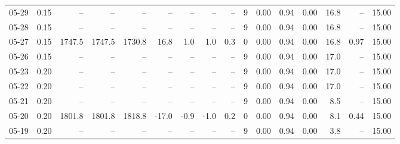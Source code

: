 \begin{threeparttable}
{\begin{tabular}{lrrrrrrrrrrrrrrr}
  05-29 &     0.15 &     -- &     -- &     -- &         -- &             -- &                       -- &                  -- &              9 &       0.00 &      0.94 &           0.00 &             16.8 &              -- &                  15.00 \\
  05-28 &     0.15 &     -- &     -- &     -- &         -- &             -- &                       -- &                  -- &              9 &       0.00 &      0.94 &           0.00 &             16.8 &              -- &                  15.00 \\
  05-27 &     0.15 & 1747.5 & 1747.5 & 1730.8 &       16.8 &            1.0 &                      1.0 &                 0.3 &              0 &       0.00 &      0.94 &           0.00 &             16.8 &            0.97 &                  15.00 \\
  05-26 &     0.15 &     -- &     -- &     -- &         -- &             -- &                       -- &                  -- &              9 &       0.00 &      0.94 &           0.00 &             17.0 &              -- &                  15.00 \\
  05-23 &     0.20 &     -- &     -- &     -- &         -- &             -- &                       -- &                  -- &              9 &       0.00 &      0.94 &           0.00 &             17.0 &              -- &                  15.00 \\
  05-22 &     0.20 &     -- &     -- &     -- &         -- &             -- &                       -- &                  -- &              9 &       0.00 &      0.94 &           0.00 &             17.0 &              -- &                  15.00 \\
  05-21 &     0.20 &     -- &     -- &     -- &         -- &             -- &                       -- &                  -- &              9 &       0.00 &      0.94 &           0.00 &              8.5 &              -- &                  15.00 \\
  05-20 &     0.20 & 1801.8 & 1801.8 & 1818.8 &      -17.0 &           -0.9 &                     -1.0 &                 0.2 &              0 &       0.00 &      0.94 &           0.00 &              8.1 &            0.44 &                  15.00 \\
  05-19 &     0.20 &     -- &     -- &     -- &         -- &             -- &                       -- &                  -- &              9 &       0.00 &      0.94 &           0.00 &              3.8 &              -- &                  15.00 \\

\end{tabular}}
\end{threeparttable}
